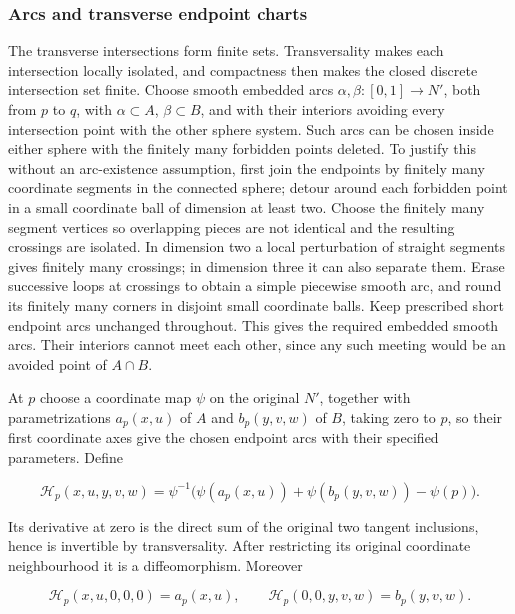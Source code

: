 \subsubsection{Arcs and transverse endpoint charts}
\label{courseIII:belt-sphere-complements-and-the-whitney-disk:section-7.1}

The transverse intersections form finite sets. Transversality makes each intersection locally isolated, and compactness then makes the closed discrete intersection set finite. Choose smooth embedded arcs
\(\alpha,\beta:[0,1]\to N'\), both from \(p\) to \(q\), with
\(\alpha\subset A\), \(\beta\subset B\), and with their interiors avoiding every intersection point with the other sphere system. Such arcs can be chosen inside either sphere with the finitely many forbidden points deleted. To justify this without an arc-existence assumption, first join the endpoints by finitely many coordinate segments in the connected sphere; detour around each forbidden point in a small coordinate ball of dimension at least two. Choose the finitely many segment vertices so overlapping pieces are not identical and the resulting crossings are isolated. In dimension two a local perturbation of straight segments gives finitely many crossings; in dimension three it can also separate them. Erase successive loops at crossings to obtain a simple piecewise smooth arc, and round its finitely many corners in disjoint small coordinate balls. Keep prescribed short endpoint arcs unchanged throughout. This gives the required embedded smooth arcs. Their interiors cannot meet each other, since any such meeting would be an avoided point of \(A\cap B\).

At \(p\) choose a coordinate map \(\psi\) on the original \(N'\), together with parametrizations
\(a_p(x,u)\) of \(A\) and \(b_p(y,v,w)\) of \(B\), taking zero to \(p\), so their first coordinate axes give the chosen endpoint arcs with their specified parameters. Define

\begin{equation}
\mathcal H_p(x,u,y,v,w)
=\psi^{-1}\bigl(
 \psi(a_p(x,u))+\psi(b_p(y,v,w))-\psi(p)
\bigr).
\label{courseIII:belt-sphere-complements-and-the-whitney-disk:eq:7.1}
\end{equation}

Its derivative at zero is the direct sum of the original two tangent inclusions, hence is invertible by transversality. After restricting its original coordinate neighbourhood it is a diffeomorphism. Moreover

\begin{equation}
\mathcal H_p(x,u,0,0,0)=a_p(x,u),\qquad
\mathcal H_p(0,0,y,v,w)=b_p(y,v,w).
\label{courseIII:belt-sphere-complements-and-the-whitney-disk:eq:7.2}
\end{equation}

